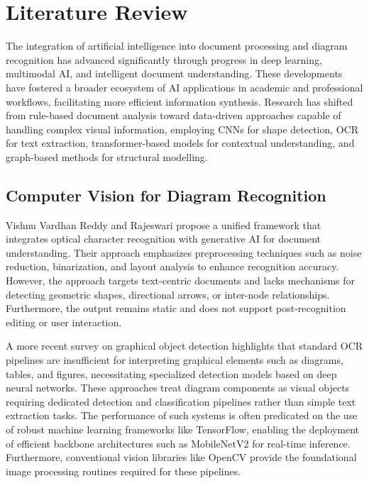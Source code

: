 \chapter{Literature Review}
\label{ch:literature}

The integration of artificial intelligence into document processing and diagram recognition has advanced significantly through progress in deep learning, multimodal AI, and intelligent document understanding. These developments have fostered a broader ecosystem of AI applications in academic and professional workflows, facilitating more efficient information synthesis. Research has shifted from rule-based document analysis toward data-driven approaches capable of handling complex visual information, employing CNNs for shape detection, OCR for text extraction, transformer-based models for contextual understanding, and graph-based methods for structural modelling.~\cite{ai-education}

\section{Computer Vision for Diagram Recognition}
\label{sec:cv-recognition}

Vishnu Vardhan Reddy and Rajeswari propose a unified framework that 
integrates optical character recognition with generative AI for 
document understanding. Their approach emphasizes preprocessing 
techniques such as noise reduction, binarization, and layout 
analysis to enhance recognition accuracy. However, the approach targets text-centric documents and lacks mechanisms for detecting geometric shapes, directional arrows, or inter-node relationships. Furthermore, the output remains static and does not support post-recognition editing or user interaction.~\cite{ocr-review}

A more recent survey on graphical object detection highlights that 
standard OCR pipelines are insufficient for interpreting graphical 
elements such as diagrams, tables, and figures, necessitating 
specialized detection models based on deep neural networks. These 
approaches treat diagram components as visual objects requiring 
dedicated detection and classification pipelines rather than simple 
text extraction tasks. The performance of such systems is often predicated on the use of robust machine learning frameworks like TensorFlow, enabling the deployment of efficient backbone architectures such as MobileNetV2 for real-time inference. Furthermore, conventional vision libraries like OpenCV provide the foundational image processing routines required for these pipelines.~\cite{opencv,mobilenet,tensorflow}

